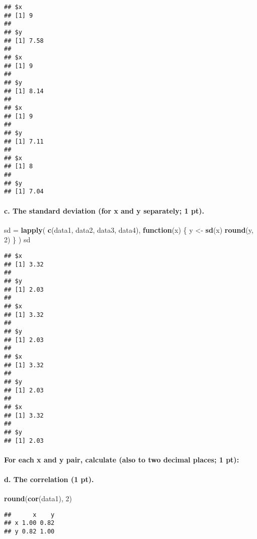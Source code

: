 \documentclass[]{article}
\newenvironment{Shaded}{\begin{snugshade}}{\end{snugshade}}
\newcommand{\KeywordTok}[1]{\textcolor[rgb]{0.13,0.29,0.53}{\textbf{#1}}}
\newcommand{\DecValTok}[1]{\textcolor[rgb]{0.00,0.00,0.81}{#1}}
\newcommand{\StringTok}[1]{\textcolor[rgb]{0.31,0.60,0.02}{#1}}
\newcommand{\ControlFlowTok}[1]{\textcolor[rgb]{0.13,0.29,0.53}{\textbf{#1}}}
\newcommand{\NormalTok}[1]{#1}
\let\oldparagraph\paragraph
\renewcommand{\paragraph}[1]{\oldparagraph{#1}\mbox{}}
\begin{document}
\begin{verbatim}
## $x
## [1] 9
## 
## $y
## [1] 7.58
## 
## $x
## [1] 9
## 
## $y
## [1] 8.14
## 
## $x
## [1] 9
## 
## $y
## [1] 7.11
## 
## $x
## [1] 8
## 
## $y
## [1] 7.04
\end{verbatim}

\paragraph{c. The standard deviation (for x and y separately; 1
pt).}\label{c.-the-standard-deviation-for-x-and-y-separately-1-pt.}

\begin{Shaded}
\begin{Highlighting}[]
\NormalTok{sd =}\StringTok{ }\KeywordTok{lapply}\NormalTok{(}
  \KeywordTok{c}\NormalTok{(data1, data2, data3, data4),}
  \ControlFlowTok{function}\NormalTok{(x) }
\NormalTok{  \{}
\NormalTok{    y <-}\StringTok{ }\KeywordTok{sd}\NormalTok{(x)}
    \KeywordTok{round}\NormalTok{(y, }\DecValTok{2}\NormalTok{)}
\NormalTok{  \}}
\NormalTok{)}
\NormalTok{sd}
\end{Highlighting}
\end{Shaded}

\begin{verbatim}
## $x
## [1] 3.32
## 
## $y
## [1] 2.03
## 
## $x
## [1] 3.32
## 
## $y
## [1] 2.03
## 
## $x
## [1] 3.32
## 
## $y
## [1] 2.03
## 
## $x
## [1] 3.32
## 
## $y
## [1] 2.03
\end{verbatim}

\paragraph{For each x and y pair, calculate (also to two decimal places;
1
pt):}\label{for-each-x-and-y-pair-calculate-also-to-two-decimal-places-1-pt}

\paragraph{d. The correlation (1 pt).}\label{d.-the-correlation-1-pt.}

\begin{Shaded}
\begin{Highlighting}[]
\KeywordTok{round}\NormalTok{(}\KeywordTok{cor}\NormalTok{(data1), }\DecValTok{2}\NormalTok{)}
\end{Highlighting}
\end{Shaded}

\begin{verbatim}
##      x    y
## x 1.00 0.82
## y 0.82 1.00
\end{verbatim}
\end{document}
